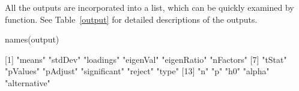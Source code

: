 






All the outputs are incorporated into a list, which can be quickly examined by  function. See Table~\ref{output} for detailed descriptions of the outputs. %

\begin{example*}
names(output)

 [1] "means"       "stdDev"      "loadings"    "eigenVal"    "eigenRatio"  "nFactors"   
 [7] "tStat"       "pValues"     "pAdjust"     "significant" "reject"      "type"
[13] "n"           "p"           "h0"          "alpha"       "alternative"
\end{example*}



